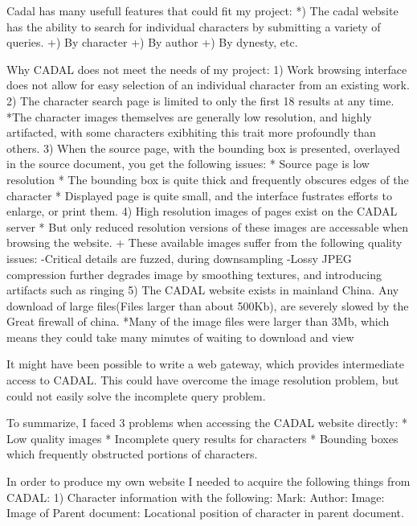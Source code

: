     Cadal has many usefull features that could fit my project:
        *)  The cadal website has the ability to search for individual characters by submitting a variety of queries.
            +)  By character
            +)  By author
            +)  By dynesty, etc.


    Why CADAL does not meet the needs of my project:
        1)  Work browsing interface does not allow for easy selection of an individual character from an existing work.
        2)  The character search page is limited to only the first 18 results at any time.
            *The character images themselves are generally low resolution, and highly artifacted, with some characters exibhiting this trait more profoundly than others.
        3)  When the source page, with the bounding box is presented, overlayed in the source document, you get the following issues:
            *  Source page is low resolution
            *  The bounding box is quite thick and frequently obscures edges of the character
            *  Displayed page is quite small, and the interface fustrates efforts to enlarge, or print them.
        4)  High resolution images of pages exist on the CADAL server
            * But only reduced resolution versions of these images are accessable when browsing the website.
                + These available images suffer from the following quality issues:
                    -Critical details are fuzzed, during downsampling
                    -Lossy JPEG compression further degrades image by smoothing textures, and introducing artifacts such as ringing
        5)  The CADAL website exists in mainland China.  Any download of large files(Files larger than about 500Kb), are severely slowed by the Great firewall of china.
            *Many of the image files were larger than 3Mb, which means they could take many minutes of waiting to download and view
        
        
    It might have been possible to write a web gateway, which provides intermediate access to CADAL.  This could have overcome the image resolution problem, but could not easily solve the incomplete query problem.
    
    To summarize, I faced 3 problems when accessing the CADAL website directly:
        *  Low quality images
        *  Incomplete query results for characters
        *  Bounding boxes which frequently obstructed portions of characters.
                    



    In order to produce my own website I needed to acquire the following things from CADAL:
        1)  Character information with the following:
            Mark:
            Author:
            Image:
            Image of Parent document:
            Locational position of character in parent document.
        
